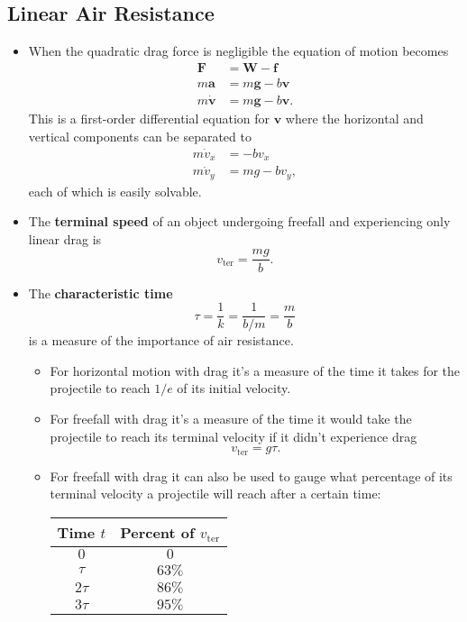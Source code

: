 \documentclass{article}
\renewcommand{\vec}[1]{\boldsymbol{\mathbf{#1}}}
\newcommand{\dvec}[1]{\dot{\vec{#1}}}
\begin{document}
\subsection{Linear Air Resistance}

\begin{itemize}
  \item When the quadratic drag force is negligible the equation of motion becomes \begin{align*}
          \vec{F}    & = \vec{W} - \vec{f}      \\
          m \vec{a}  & = m \vec{g} - b \vec{v}  \\
          m \dvec{v} & = m \vec{g} - b \vec{v}.
        \end{align*} This is a first-order differential equation for $\vec{v}$ where the horizontal and vertical components can be separated to \begin{align*}
          m \dot{v}_x & = -b v_x       \\
          m \dot{v}_y & = m g - b v_y,
        \end{align*} each of which is easily solvable.

  \item The \textbf{terminal speed} of an object undergoing freefall and experiencing only linear drag is \[v_\text{ter} = \frac{m g}{b}.\]

  \item The \textbf{characteristic time} \[\tau = \frac{1}{k} = \frac{1}{b / m} = \frac{m}{b}\] is a measure of the importance of air resistance.

        \begin{itemize}
          \item For horizontal motion with drag it's a measure of the time it takes for the projectile to reach $1 / e$ of its initial velocity.

          \item For freefall with drag it's a measure of the time it would take the projectile to reach its terminal velocity if it didn't experience drag \[v_\text{ter} = g \tau.\]

          \item For freefall with drag it can also be used to gauge what percentage of its terminal velocity a projectile will reach after a certain time:

                \begin{center}
                  \begin{tabular}{c c}
                    Time $t$ & Percent of $v_\text{ter}$ \\
                    \hline
                    $0$      & $0$                       \\
                    $\tau$   & $63\%$                    \\
                    $2 \tau$ & $86\%$                    \\
                    $3 \tau$ & $95\%$
                  \end{tabular}
                \end{center}


\end{itemize}
\end{itemize}
\end{document}
